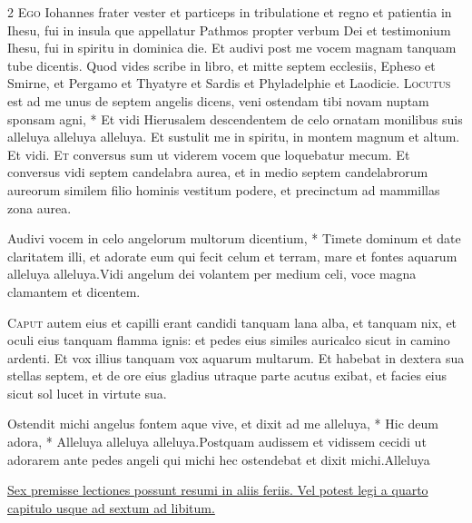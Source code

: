 \begin{multicols*}{2}
\lettrine[lines=2]{\zallmancaps \color{Red} E}{go} Iohannes frater vester et particeps in tribulatione et regno et patientia in Ihesu, fui in insula que appellatur Pathmos propter verbum Dei et testimonium Ihesu, fui in spiritu in dominica die. Et audivi post me vocem magnam tanquam tube dicentis. Quod vides scribe in libro, et mitte septem ecclesiis, Epheso et Smirne, et Pergamo et Thyatyre et Sardis et Phyladelphie et Laodicie. \R
\lettrine[lines=2]{\zallmancaps \color{Blue} L}{ocutus} \hypertarget{locutus-est-pasche}{\label{locutus-est-pasche}} est ad me unus de septem angelis dicens, veni ostendam tibi novam nuptam sponsam agni, * Et vidi Hierusalem descendentem de celo ornatam monilibus suis alleluya alleluya alleluya. \V Et sustulit me in spiritu, in montem magnum et altum. Et vidi.
\lettrine[lines=2]{\zallmancaps \color{Red} E}{t} conversus sum ut viderem vocem que loquebatur mecum. Et conversus vidi septem candelabra aurea, et in medio septem candelabrorum aureorum similem filio hominis vestitum podere, et precinctum ad mammillas zona aurea.
\begin{responsory}
{Audivi vocem in celo angelorum multorum dicentium, * Timete dominum et date claritatem illi, et adorate eum qui fecit celum et terram, mare et fontes aquarum alleluya alleluya.}{Vidi angelum dei volantem per medium celi, voce magna clamantem et dicentem.}
\end{responsory}%
\lettrine[lines=2]{\zallmancaps \color{Blue} C}{aput} autem eius et capilli erant candidi tanquam lana alba, et tanquam nix, et oculi eius tanquam flamma ignis: et pedes eius similes auricalco sicut in camino ardenti. Et vox illius tanquam vox aquarum multarum. Et habebat in dextera sua stellas septem, et de ore eius gladius utraque parte acutus exibat, et facies eius sicut sol lucet in virtute sua.
\begin{responsory-final}
{Ostendit michi angelus fontem aque vive, et dixit ad me alleluya, * Hic deum adora, * Alleluya alleluya alleluya.}{Postquam audissem et vidissem cecidi ut adorarem ante pedes angeli qui michi hec ostendebat et dixit michi.}{Alleluya}
\end{responsory-final}%
\newline \ul{Sex premisse lectiones possunt resumi in aliis feriis. Vel potest legi a quarto capitulo usque ad sextum ad libitum.}

\end{multicols*}
